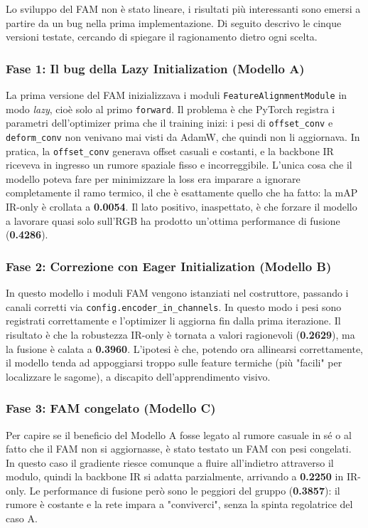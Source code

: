 \documentclass[a4paper,11pt]{article}
\begin{document}
Lo sviluppo del FAM non è stato lineare, i risultati più interessanti sono emersi a partire da un bug nella prima implementazione. Di seguito descrivo le cinque versioni testate, cercando di spiegare il ragionamento dietro ogni scelta.
 
\subsubsection*{Fase 1: Il bug della Lazy Initialization (Modello A)}
La prima versione del FAM inizializzava i moduli \texttt{FeatureAlignmentModule} in modo \textit{lazy}, cioè solo al primo \texttt{forward}. Il problema è che PyTorch registra i parametri dell'optimizer prima che il training inizi: i pesi di \texttt{offset\_conv} e \texttt{deform\_conv} non venivano mai visti da AdamW, che quindi non li aggiornava. In pratica, la \texttt{offset\_conv} generava offset casuali e costanti, e la backbone IR riceveva in ingresso un rumore spaziale fisso e incorreggibile. L'unica cosa che il modello poteva fare per minimizzare la loss era imparare a ignorare completamente il ramo termico, il che è esattamente quello che ha fatto: la mAP IR-only è crollata a \textbf{0.0054}. Il lato positivo, inaspettato, è che forzare il modello a lavorare quasi solo sull'RGB ha prodotto un'ottima performance di fusione (\textbf{0.4286}).
 
\subsubsection*{Fase 2: Correzione con Eager Initialization (Modello B)}
In questo modello i moduli FAM vengono istanziati nel costruttore, passando i canali corretti via \texttt{config.encoder\_in\_channels}. In questo modo i pesi sono registrati correttamente e l'optimizer li aggiorna fin dalla prima iterazione. Il risultato è che la robustezza IR-only è tornata a valori ragionevoli (\textbf{0.2629}), ma la fusione è calata a \textbf{0.3960}. L'ipotesi è che, potendo ora allinearsi correttamente, il modello tenda ad appoggiarsi troppo sulle feature termiche (più "facili" per localizzare le sagome), a discapito dell'apprendimento visivo.
 
\subsubsection*{Fase 3: FAM congelato (Modello C)}
Per capire se il beneficio del Modello A fosse legato al rumore casuale in sé o al fatto che il FAM non si aggiornasse, è stato testato un FAM con pesi congelati. In questo caso il gradiente riesce comunque a fluire all'indietro attraverso il modulo, quindi la backbone IR si adatta parzialmente, arrivando a \textbf{0.2250} in IR-only. Le performance di fusione però sono le peggiori del gruppo (\textbf{0.3857}): il rumore è costante e la rete impara a "conviverci", senza la spinta regolatrice del caso A.
 
\end{document}
